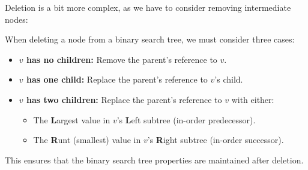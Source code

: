 \noindent
Deletion is a bit more complex, as we have to consider removing intermediate nodes:

\begin{theo}

    When deleting a node from a binary search tree, we must consider three cases:
    \begin{itemize}
        \item \textbf{$v$ has no children:} Remove the parent's reference to $v$.
        \item \textbf{$v$ has one child:} Replace the parent's reference to $v$'s child.
        \item \textbf{$v$ has two children:} Replace the parent's reference to $v$ with either:
            \begin{itemize}
                \item The \textbf{L}argest value in $v$'s \textbf{L}eft subtree (in-order predecessor).
                \item The \textbf{R}unt (smallest) value in $v$'s \textbf{R}ight subtree (in-order successor).
            \end{itemize}
    \end{itemize}

    \noindent
    This ensures that the binary search tree properties are maintained after deletion.
\end{theo}

